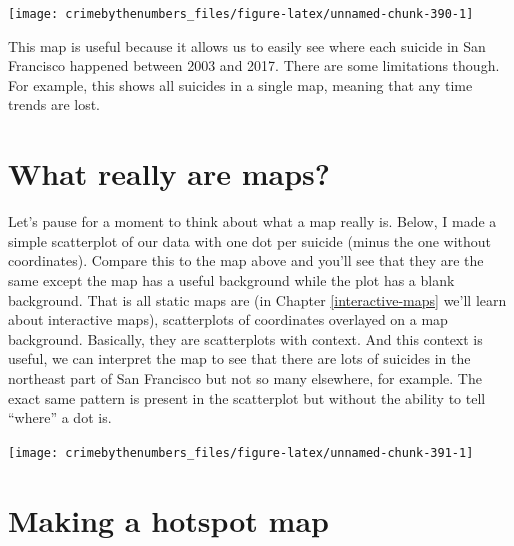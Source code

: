\documentclass[
]{krantz}
\makeatletter
\newenvironment{Shaded}{\begin{snugshade}}{\end{snugshade}}
\newcommand{\AttributeTok}[1]{\textcolor[rgb]{0.61,0.61,0.61}{#1}}
\newcommand{\FunctionTok}[1]{\textcolor[rgb]{0,0,0}{#1}}
\newcommand{\NormalTok}[1]{#1}
\newcommand{\SpecialCharTok}[1]{\textcolor[rgb]{0,0,0}{#1}}
\newcommand{\StringTok}[1]{\textcolor[rgb]{0.5,0.5,0.5}{#1}}
\newenvironment{kframe}{%
\medskip{}
\setlength{\fboxsep}{.8em}
 \def\at@end@of@kframe{}%
 \ifinner\ifhmode%
  \def\at@end@of@kframe{\end{minipage}}%
  \begin{minipage}{\columnwidth}%
 \fi\fi%
 \def\FrameCommand##1{\hskip\@totalleftmargin \hskip-\fboxsep
 \colorbox{shadecolor}{##1}\hskip-\fboxsep
     \hskip-\linewidth \hskip-\@totalleftmargin \hskip\columnwidth}%
 \MakeFramed {\advance\hsize-\width
   \@totalleftmargin\z@ \linewidth\hsize
   \@setminipage}}%
 {\par\unskip\endMakeFramed%
 \at@end@of@kframe}
\renewenvironment{Shaded}{\begin{kframe}}{\end{kframe}}
\makeatother
\begin{document}
\begin{center}\texttt{[image: crimebythenumbers\_files/figure-latex/unnamed-chunk-390-1]} \end{center}

This map is useful because it allows us to easily see where
each suicide in San Francisco happened between 2003 and
2017. There are some limitations though. For example, this
shows all suicides in a single map, meaning that any time
trends are lost.

\hypertarget{what-really-are-maps}{%
\section{What really are maps?}\label{what-really-are-maps}}

Let's pause for a moment to think about what a map really
is. Below, I made a simple scatterplot of our data with one
dot per suicide (minus the one without coordinates). Compare
this to the map above and you'll see that they are the same
except the map has a useful background while the plot has a
blank background. That is all static maps are (in Chapter
\ref{interactive-maps} we'll learn about interactive maps),
scatterplots of coordinates overlayed on a map background.
Basically, they are scatterplots with context. And this
context is useful, we can interpret the map to see that
there are lots of suicides in the northeast part of San
Francisco but not so many elsewhere, for example. The exact
same pattern is present in the scatterplot but without the
ability to tell ``where'' a dot is.

\begin{Shaded}
\end{Shaded}

\begin{center}\texttt{[image: crimebythenumbers\_files/figure-latex/unnamed-chunk-391-1]} \end{center}

\hypertarget{making-a-hotspot-map}{%
\section{Making a hotspot map}\label{making-a-hotspot-map}}
\end{document}

